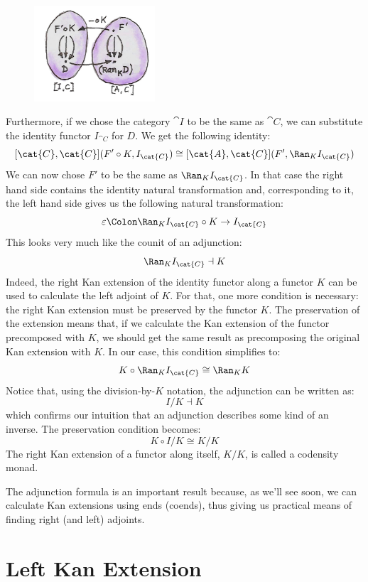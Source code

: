 \begin{figure}[H]
\centering
\includegraphics[width=0.4\textwidth]{images/kan92.jpg}
\end{figure}

\noindent
Furthermore, if we chose the category $\cat{I}$ to be the same as
$\cat{C}$, we can substitute the identity functor $I_{\cat{C}}$ for
$D$. We get the following identity:
\[[\cat{C}, \cat{C}](F' \circ K, I_{\cat{C}}) \cong [\cat{A}, \cat{C}](F', \Ran_{K}I_{\cat{C}})\]
We can now chose $F'$ to be the same as $\Ran_{K}I_{\cat{C}}$. In
that case the right hand side contains the identity natural
transformation and, corresponding to it, the left hand side gives us the
following natural transformation:
\[\varepsilon \Colon \Ran_{K}I_{\cat{C}} \circ K \to I_{\cat{C}}\]
This looks very much like the counit of an adjunction:
\[\Ran_{K}I_{\cat{C}} \dashv K\]
Indeed, the right Kan extension of the identity functor along a functor
$K$ can be used to calculate the left adjoint of $K$. For
that, one more condition is necessary: the right Kan extension must be
preserved by the functor $K$. The preservation of the extension
means that, if we calculate the Kan extension of the functor precomposed
with $K$, we should get the same result as precomposing the
original Kan extension with $K$. In our case, this condition
simplifies to:
\[K \circ \Ran_{K}I_{\cat{C}} \cong \Ran_{K}K\]
Notice that, using the division-by-$K$ notation, the adjunction can be
written as:
\[I/K \dashv K\]
which confirms our intuition that an adjunction describes some kind of
an inverse. The preservation condition becomes:
\[K \circ I/K \cong K/K\]
The right Kan extension of a functor along itself, $K/K$, is
called a codensity monad.

The adjunction formula is an important result because, as we'll see
soon, we can calculate Kan extensions using ends (coends), thus giving
us practical means of finding right (and left) adjoints.

\section{Left Kan Extension}

